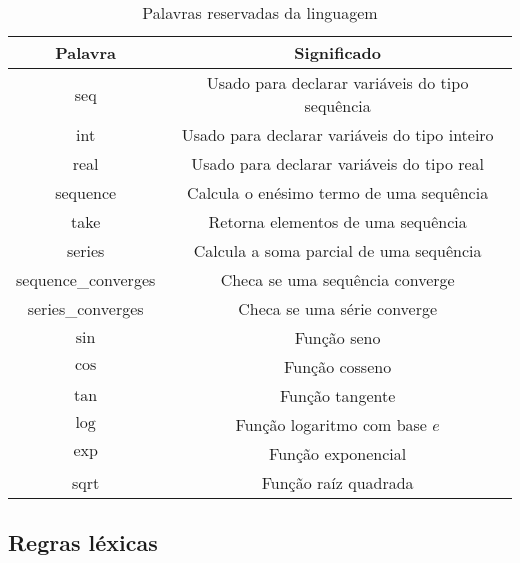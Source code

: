 \documentclass[a4 paper, 12pt]{article}
\begin{document}
\begin{table}[h]
\begin{center}
\begin{tabular}{|c|c|}
\hline
Palavra             & Significado                                                         \\ \hline
seq                 & Usado para declarar vari\'aveis do tipo sequ\^encia \\ \hline
int                 & Usado para declarar vari\'aveis do tipo inteiro                     \\ \hline
real                & Usado para declarar vari\'aveis do tipo real                        \\ \hline
sequence            & Calcula o en\'esimo termo de uma sequ\^encia           \\ \hline
take                & Retorna elementos de uma sequ\^encia                \\ \hline
series              & Calcula a soma parcial de uma sequ\^encia           \\ \hline
sequence\_converges & Checa se uma sequ\^encia converge                   \\ \hline
series\_converges   & Checa se uma s\'erie converge                   \\ \hline
$\sin$              & Fun\c c\~ao seno                                                    \\ \hline
$\cos$              & Fun\c c\~ao cosseno                                                 \\ \hline
$\tan$              & Fun\c c\~ao tangente                                                \\ \hline
$\log$              & Fun\c c\~ao logaritmo com base $e$                                  \\ \hline
$\exp$              & Fun\c c\~ao exponencial                                             \\ \hline
sqrt                & Fun\c c\~ao ra\'iz quadrada                                         \\ \hline
\end{tabular}
\caption{Palavras reservadas da linguagem}
\label{tab1}
\end{center}
\end{table}

\subsection{Regras l\'exicas}
\end{document}

